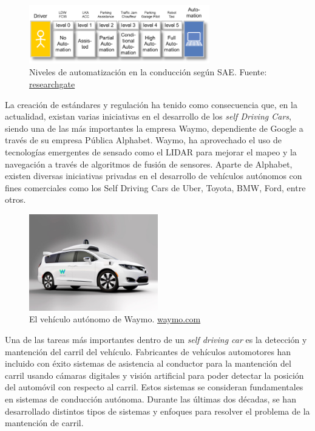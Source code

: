 \documentclass[12pt,letterpaper]{article}
\begin{document}
\begin{figure}[!h] 
\centering
\includegraphics[width=0.70\textwidth]{levels}
\caption{Niveles de automatización en la conducción según SAE. 
        Fuente: \href{https://www.researchgate.net/figure/Terms-related-to-automated-driving-according-to-SAE-and-VDA_fig1_273883061}{researchgate} }
\label{fig:levels}
\end{figure}

La creación de estándares y regulación ha tenido como consecuencia que, en la actualidad, existan varias iniciativas 
en el desarrollo de los \textit{self Driving Cars}, siendo una de las más 
importantes la empresa Waymo, dependiente de Google a través de su empresa Pública Alphabet. Waymo, ha aprovechado 
el uso de tecnologías emergentes de sensado como el LIDAR para mejorar el mapeo y la navegación a través de algoritmos 
de fusión de sensores. Aparte de Alphabet, existen diversas iniciativas privadas en el desarrollo de vehículos autónomos 
con fines comerciales como los Self Driving Cars de Uber, Toyota, BMW, Ford, entre otros.


\begin{figure}[!h] 
\centering
\includegraphics[width=0.5\textwidth]{waymo}
\caption{El vehículo autónomo de Waymo. 
        \href{https://waymo.com/}{waymo.com}}
\label{fig:waymo}
\end{figure}

Una de las tareas más importantes dentro de un \textit{self driving car} es la detección y mantención del carril del 
vehículo. Fabricantes de vehículos automotores han incluido con éxito sistemas de asistencia al conductor para la 
mantención del carril usando cámaras digitales y visión artificial para poder detectar la posición del automóvil con 
respecto al carril. Estos sistemas se consideran fundamentales en sistemas de conducción autónoma. Durante las últimas 
dos décadas, se han desarrollado distintos tipos de sistemas y enfoques para resolver el problema de la mantención de 
carril.
\end{document}
